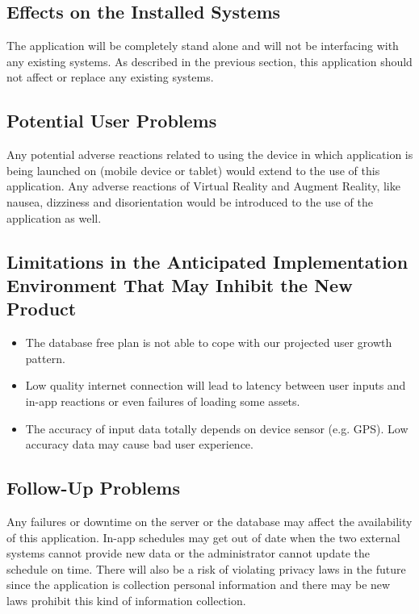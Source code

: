 \documentclass[12pt]{article}
\begin{document}
\subsection{Effects on the Installed Systems}

The application will be completely stand alone and will not be interfacing with any existing systems.  As described in the previous section, this application should not affect or replace any existing systems.

\subsection{Potential User Problems}

Any potential adverse reactions related to using the device in which application is being launched on (mobile device or tablet) would extend to the use of this application.  Any adverse reactions of Virtual Reality and Augment Reality, like nausea, dizziness and disorientation would be introduced to the use of the application as well.

\subsection{Limitations in the Anticipated Implementation Environment That May
Inhibit the New Product}

\begin{itemize}
\item The database free plan is not able to cope with our projected user growth pattern.
\item Low quality internet connection will lead to latency between user inputs and in-app reactions or even failures of loading some assets.
\item The accuracy of input data totally depends on device sensor (e.g. GPS). Low accuracy data may cause bad user experience.
\end{itemize}

\subsection{Follow-Up Problems}

Any failures or downtime on the server or the database may affect the availability of this application. In-app schedules may get out of date when the two external systems cannot provide new data or the administrator cannot update the schedule on time. There will also be a risk of violating privacy laws in the future since the application is collection personal information and there may be new laws prohibit this kind of information collection.
\end{document}
